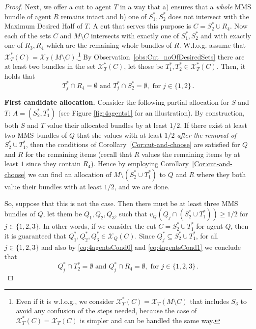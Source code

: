 \begin{proof}
    Next, we offer a cut to agent $T$ in a way that a) ensures that a {\em whole} MMS bundle of agent $R$ remains intact and b) one of $S_1^*, S_2^*$ does not intersect with the Maximum Desired Half of $T$. A cut that serves this purpose is $C=S_2^* \cup R_4$. Now each of the sets $C$ and $M\setminus C$ intersects with exactly one of $S^*_1, S^*_2$ and with exactly one of $R_3, R_4$ which are the remaining whole bundles of $R$. W.l.o.g. assume that $\mathcal{X}_{T}^*(C)=\mathcal{X}_{T}(M \setminus C)$.\footnote{Even if it is w.l.o.g., we consider $\mathcal{X}_{T}^*(C)=\mathcal{X}_{T}(M \setminus C)$ that includes $S_3$ to avoid any confusion of the steps needed, because the case of $\mathcal{X}_{T}^*(C)=\mathcal{X}_{T}(C)$ is simpler and can be handled the same way.} 
    By Observation~\ref{obs:Cut_noOfDesiredSets} there are at least two bundles in the set $\mathcal{X}_{T}^*(C)$, let those be $T_1^*,T_2^* \in \mathcal{X}_{T}^*(C)$. Then, it holds that 
    \begin{equation}
    \label{eq:4agentsCond1}
        T_j^*\cap R_4 = \emptyset \mbox{ and } T_j^*\cap S_2^* = \emptyset, \mbox{ for } j \in \{1,2\}\,.
    \end{equation}
    
    {\bf First candidate allocation.} Consider the following partial allocation for $S$ and $T$: $A= (S^*_2,T^*_1)$ (see Figure \ref{fig:4agents1} for an illustration). By construction, both $S$ and $T$ value their allocated bundles by at least $1/2$. If there exist at least two MMS bundles of $Q$ that she values with at least $1/2$ {\em after the removal of $S^*_2\cup T^*_1$}, then the conditions of Corollary~\ref{Cor:cut-and-choose} are satisfied for $Q$ and $R$ for the remaining items (recall that $R$ values the remaining items by at least $1$ since they contain $R_4$). Hence by  employing Corollary~\ref{Cor:cut-and-choose} we can find an allocation of $M\setminus (S^*_2\cup T^*_1)$ to $Q$ and $R$ where they both value their bundles with at least $1/2$, and we are done.   
        
    So, suppose that this is not the case. Then there must be at least three MMS bundles of $Q$, let them be $Q_1,Q_2,Q_3$, such that $v_Q(Q_j\cap(S^*_2\cup T^*_1))\geq 1/2$ for $j\in\{1, 2, 3\}$. In other words, if we consider the cut $C=S^*_2\cup T^*_1$ for agent $Q$, then it is guaranteed that $Q_1^*,Q^*_2,Q^*_3 \in \mathcal{X}_{Q}(C)$. Since $Q_j^*\subseteq S^*_2\cup T^*_1$, for all $j \in \{1,2,3\}$ and also by \eqref{eq:4agentsCond0} and \eqref{eq:4agentsCond1} we conclude that
    \begin{equation}
        \label{eq:4agentsCond2}
        Q_j^* \cap T^*_2 = \emptyset \mbox{ and } Q_j^* \cap R_4= \emptyset , \mbox{ for } j \in \{1,2,3\}\,.
    \end{equation}



\end{proof}
